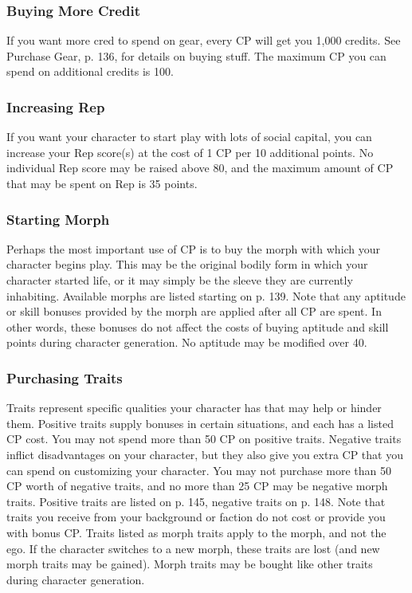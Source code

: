 \subsubsection{Buying More Credit}
If you want more cred to spend on gear, every CP will get you 1,000
credits. See Purchase Gear, p. 136, for details on buying stuff. The maximum CP
you can spend on additional credits is 100.

\subsubsection{Increasing Rep}
If you want your character to start play with lots of social capital, you can
increase your Rep score(s) at the cost of 1 CP per 10 additional points. No
individual Rep score may be raised above 80, and the maximum amount of CP
that may be spent on Rep is 35 points.

\subsubsection{Starting Morph}
Perhaps the most important use of CP is to buy the morph with which your
character begins play. This may be the original bodily form in which your
character started life, or it may simply be the sleeve they are currently
inhabiting.  Available morphs are listed starting on p. 139.  Note that any
aptitude or skill bonuses provided by the morph are applied after all CP are
spent. In other words, these bonuses do not affect the costs of buying aptitude
and skill points during character generation.  No aptitude may be modified over
40.

\subsubsection{Purchasing Traits}
Traits represent specific qualities your character has that may help or hinder
them.  Positive traits supply bonuses in certain situations, and each has a
listed CP cost. You may not spend more than 50 CP on positive traits.  Negative
traits inflict disadvantages on your character, but they also give you extra
CP that you can spend on customizing your character. You may not purchase more
than 50 CP worth of negative traits, and no more than 25 CP may be negative
morph traits.  Positive traits are listed on p. 145, negative traits on
p. 148. Note that traits you receive from your background or faction do not
cost or provide you with bonus CP.  Traits listed as morph traits apply to the
morph, and not the ego. If the character switches to a new morph, these traits
are lost (and new morph traits may be gained). Morph traits may be bought like
other traits during character generation.

